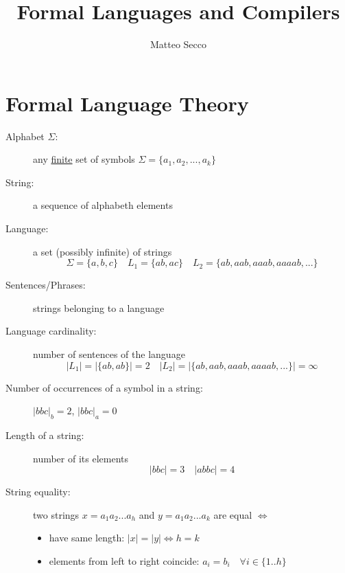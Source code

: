 \documentclass{article}
\title{Formal Languages and Compilers}
\author{Matteo Secco}
\begin{document}
\maketitle\newpage
\tableofcontents\newpage

\section{Formal Language Theory}
\begin{description}
\item[Alphabet $\Sigma$:] any \underline{finite} set of symbols $\Sigma=\{a_1,a_2,...,a_k\}$
\item[String:] a sequence of alphabeth elements
\item[Language:] a set (possibly  infinite) of strings
\[
\Sigma=\{a,b,c\}
\quad
L_1=\{ab,ac\}
\quad
L_2=\{ab, aab, aaab, aaaab, ...\}
\]
\item[Sentences/Phrases:] strings belonging to a language
\item[Language cardinality:] number of sentences of the language
\[
|L_1|=|\{ab,ab\}|=2
\quad
|L_2|=|\{ab, aab, aaab, aaaab, ...\}|=\infty
\]
\item[Number of occurrences of a symbol in a string:] $|bbc|_b=2$, $|bbc|_a=0$
\item[Length of a string:] number of its elements
\[
|bbc|=3
\quad
|abbc|=4
\]
\item[String equality:] two strings $x=a_1a_2...a_h$ and $y=a_1a_2...a_k$ are equal $\iff$
\begin{itemize}
\item have same length: $|x|=|y| \iff h=k$
\item elements from left to  right coincide: $a_i=b_i \quad \forall i\in\{1..h\}$
\end{itemize}
\end{description}
\end{document}
